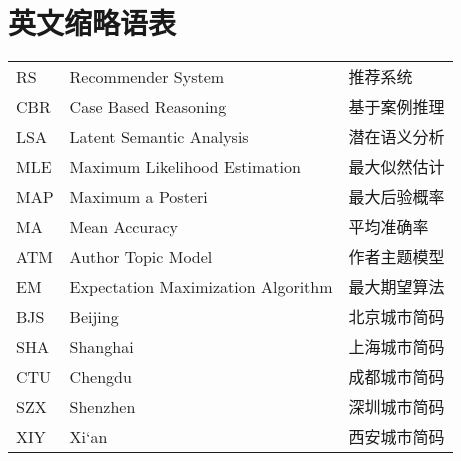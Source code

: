 \chapter{英文缩略语表}
\label{chap:abb}

\begin{table}[!h]
\centering
\begin{tabular}{p{1.5cm}p{8cm}p{3.5cm}} 

RS  & Recommender System & 推荐系统 \\

CBR  & Case Based Reasoning & 基于案例推理 \\

LSA  & Latent Semantic Analysis & 潜在语义分析 \\

MLE  & Maximum Likelihood Estimation & 最大似然估计 \\

MAP  & Maximum a Posteri & 最大后验概率 \\

MA  & Mean Accuracy & 平均准确率 \\

ATM  & Author Topic Model & 作者主题模型 \\

EM  & Expectation Maximization Algorithm & 最大期望算法 \\

BJS  & Beijing & 北京城市简码 \\

SHA  & Shanghai & 上海城市简码 \\

CTU  & Chengdu & 成都城市简码 \\

SZX  & Shenzhen & 深圳城市简码 \\

XIY  & Xi‘an & 西安城市简码 \\

\end{tabular}
\end{table}
